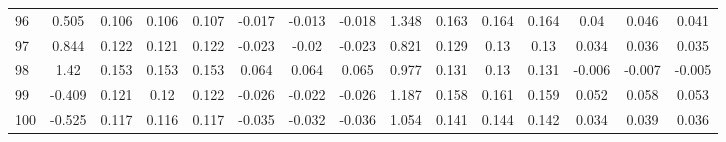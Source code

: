 \begin{table}[H]
{\begin{tabular}{l|c|ccc|ccc|c|ccc|ccc}
			96 & 0.505 & 0.106 & 0.106 & 0.107 & -0.017 & -0.013 & -0.018 & 1.348 & 0.163 & 0.164 & 0.164 & 0.04 & 0.046 & 0.041 \\
			97 & 0.844 & 0.122 & 0.121 & 0.122 & -0.023 & -0.02 & -0.023 & 0.821 & 0.129 & 0.13 & 0.13 & 0.034 & 0.036 & 0.035 \\
			98 & 1.42 & 0.153 & 0.153 & 0.153 & 0.064 & 0.064 & 0.065 & 0.977 & 0.131 & 0.13 & 0.131 & -0.006 & -0.007 & -0.005 \\
			99 & -0.409 & 0.121 & 0.12 & 0.122 & -0.026 & -0.022 & -0.026 & 1.187 & 0.158 & 0.161 & 0.159 & 0.052 & 0.058 & 0.053 \\
			100 & -0.525 & 0.117 & 0.116 & 0.117 & -0.035 & -0.032 & -0.036 & 1.054 & 0.141 & 0.144 & 0.142 & 0.034 & 0.039 & 0.036 \\
	\end{tabular}}
	
\end{table}
\pagebreak
